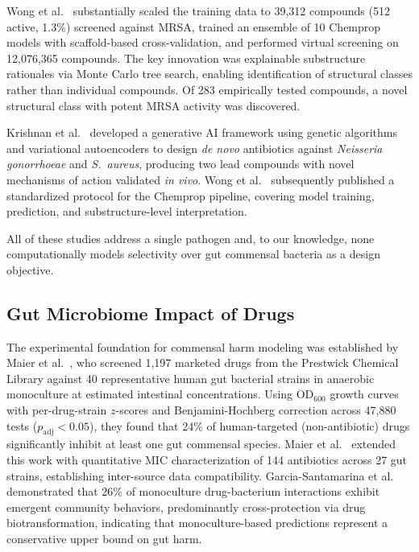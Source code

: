 \documentclass{article}
\begin{document}
Wong et al.~\citep{wong2024} substantially scaled the training data to 39,312 compounds (512 active, 1.3\%) screened against MRSA, trained an ensemble of 10 Chemprop models with scaffold-based cross-validation, and performed virtual screening on 12,076,365 compounds.
The key innovation was explainable substructure rationales via Monte Carlo tree search, enabling identification of structural classes rather than individual compounds.
Of 283 empirically tested compounds, a novel structural class with potent MRSA activity was discovered.

Krishnan et al.~\citep{krishnan2025} developed a generative AI framework using genetic algorithms and variational autoencoders to design \textit{de novo} antibiotics against \textit{Neisseria gonorrhoeae} and \textit{S.~aureus}, producing two lead compounds with novel mechanisms of action validated \textit{in vivo}.
Wong et al.~\citep{wong2025protocol} subsequently published a standardized protocol for the Chemprop pipeline, covering model training, prediction, and substructure-level interpretation.

All of these studies address a single pathogen and, to our knowledge, none computationally models selectivity over gut commensal bacteria as a design objective.

\subsection{Gut Microbiome Impact of Drugs}

The experimental foundation for commensal harm modeling was established by Maier et al.~\citep{maier2018}, who screened 1,197 marketed drugs from the Prestwick Chemical Library against 40 representative human gut bacterial strains in anaerobic monoculture at estimated intestinal concentrations.
Using OD$_{600}$ growth curves with per-drug-strain $z$-scores and Benjamini-Hochberg correction across 47,880 tests ($p_{\mathrm{adj}} < 0.05$), they found that 24\% of human-targeted (non-antibiotic) drugs significantly inhibit at least one gut commensal species.
Maier et al.~\citep{maier2021} extended this work with quantitative MIC characterization of 144 antibiotics across 27 gut strains, establishing inter-source data compatibility.
Garcia-Santamarina et al.~\citep{garcia2024} demonstrated that 26\% of monoculture drug-bacterium interactions exhibit emergent community behaviors, predominantly cross-protection via drug biotransformation, indicating that monoculture-based predictions represent a conservative upper bound on gut harm.
\end{document}
